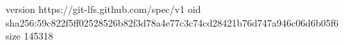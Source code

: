 version https://git-lfs.github.com/spec/v1
oid sha256:59c822f5ff02528526b82f3d78a4e77c3c74cd28421b76d747a946c06d6b05f6
size 145318
